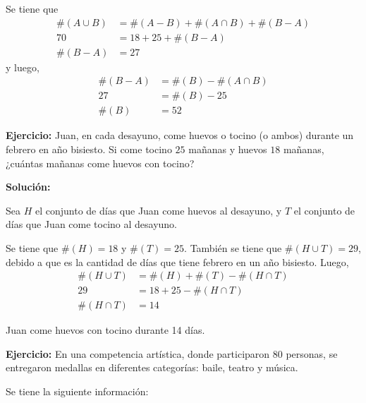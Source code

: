 \documentclass[a4paper,10pt]{article}
\begin{document}
    Se tiene que
        \begin{align*}
            \#(A\cup B) &= \#(A-B) + \#(A \cap B) + \#(B-A) \\
                     70 &= 18 + 25 + \#(B-A) \\
                \#(B-A) &= 27
        \end{align*}
    y luego,
        \begin{align*}
            \#(B-A) &= \#(B) - \#(A \cap B) \\
                 27 &= \#(B) - 25 \\
              \#(B) &= 52
        \end{align*}
    \vspace{5mm}








\textbf{Ejercicio:} Juan, en cada desayuno, come huevos o tocino (o ambos) durante un febrero en año bisiesto. Si come tocino $25$ mañanas y huevos $18$ mañanas, ¿cuántas mañanas come huevos con tocino? \vspace{3mm}

\textbf{Solución:}

    Sea $H$ el conjunto de días que Juan come huevos al desayuno, y $T$ el conjunto de días que Juan come tocino al desayuno.

    Se tiene que $\#(H)=18$ y $\#(T)=25$. También se tiene que $\#(H \cup T) = 29$, debido a que es la cantidad de días que tiene febrero en un año bisiesto. Luego,
        \begin{align*}
            \#(H \cup T) &= \#(H) + \#(T) - \#(H \cap T) \\
                 29 &= 18 + 25- \#(H \cap T) \\
              \#(H \cap T) &= 14
        \end{align*}

    Juan come huevos con tocino durante 14 días.
    \newpage








\textbf{Ejercicio:} En una competencia artística, donde participaron 80 personas, se entregaron medallas en diferentes categorías: baile, teatro y música.

                    Se tiene la siguiente información:
\end{document}
